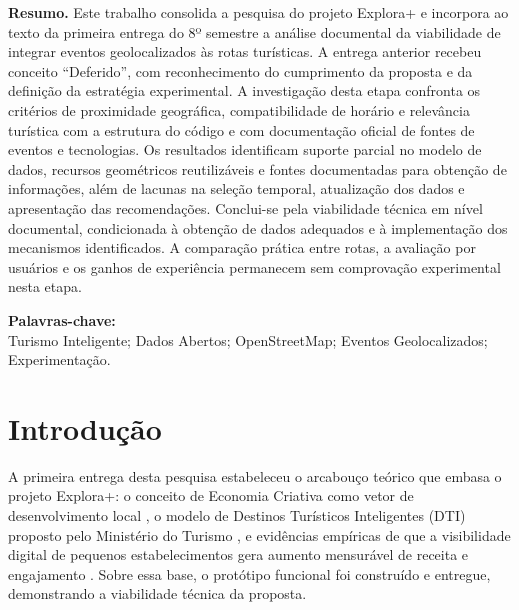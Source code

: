 \documentclass[12pt, a4paper]{article}
\begin{document}
\thispagestyle{plain}
\noindent\textbf{Resumo.} Este trabalho consolida a pesquisa do projeto Explora+ e incorpora ao texto da primeira entrega do 8º semestre a análise documental da viabilidade de integrar eventos geolocalizados às rotas turísticas. A entrega anterior recebeu conceito “Deferido”, com reconhecimento do cumprimento da proposta e da definição da estratégia experimental. A investigação desta etapa confronta os critérios de proximidade geográfica, compatibilidade de horário e relevância turística com a estrutura do código e com documentação oficial de fontes de eventos e tecnologias. Os resultados identificam suporte parcial no modelo de dados, recursos geométricos reutilizáveis e fontes documentadas para obtenção de informações, além de lacunas na seleção temporal, atualização dos dados e apresentação das recomendações. Conclui-se pela viabilidade técnica em nível documental, condicionada à obtenção de dados adequados e à implementação dos mecanismos identificados. A comparação prática entre rotas, a avaliação por usuários e os ganhos de experiência permanecem sem comprovação experimental nesta etapa.
\par\vspace{0.4cm}
\noindent\textbf{Palavras-chave:}\\
Turismo Inteligente; Dados Abertos; OpenStreetMap; Eventos Geolocalizados; Experimenta\c{c}\~ao.
\clearpage

\thispagestyle{plain}
\tableofcontents
\clearpage
{}
\setcounter{page}{1}

\section{Introdu\c{c}\~ao}

A primeira entrega desta pesquisa estabeleceu o arcabou\c{c}o te\'orico que embasa o projeto Explora+: o conceito de Economia Criativa como vetor de desenvolvimento local \parencite{silva2020}, o modelo de Destinos Tur\'isticos Inteligentes (DTI) proposto pelo Minist\'erio do Turismo \parencite{brasil2022}, e evid\^encias emp\'iricas de que a visibilidade digital de pequenos estabelecimentos gera aumento mensur\'avel de receita \parencite{luca2022} e engajamento \parencite{shankar2025}. Sobre essa base, o prot\'otipo funcional foi constru\'ido e entregue, demonstrando a viabilidade t\'ecnica da proposta.
\end{document}
